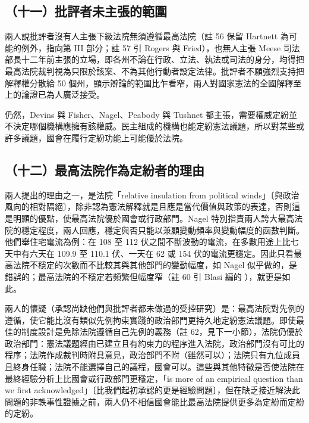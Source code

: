 \subsection{（十一）批評者未主張的範圍}

兩人說批評者沒有人主張下級法院無須遵循最高法院（註 56 保留 Hartnett 為可能的例外，指向第 III 部分；註 57 引 Rogers 與 Fried），也無人主張 Meese 司法部長十二年前主張的立場，即各州不論在行政、立法、執法或司法的身分，均得把最高法院裁判視為只限於該案、不為其他行動者設定法律。批評者不願強烈支持把解釋權分散給 50 個州，顯示辯論的範圍比乍看窄，兩人對國家憲法的全國解釋至上的論證已為人廣泛接受。

仍然，Devins 與 Fisher、Nagel、Peabody 與 Tushnet 都主張，需要權威定紛並不決定哪個機構應擁有該權威。民主組成的機構也能定紛憲法議題，所以對某些或許多議題，國會在履行定紛功能上可能優於法院。

\subsection{（十二）最高法院作為定紛者的理由}

兩人提出的理由之一，是法院「relative insulation from political winds」〔與政治風向的相對隔絕〕，除非認為憲法解釋就是且應是當代價值與政策的表達，否則這是明顯的優點，使最高法院優於國會或行政部門。Nagel 特別指責兩人誇大最高法院的穩定程度，兩人回應，穩定與否只能以兼顧變動頻率與變動幅度的函數判斷。他們舉住宅電流為例：在 108 至 112 伏之間不斷波動的電流，在多數用途上比七天中有六天在 109.9 至 110.1 伏、一天在 62 或 154 伏的電流更穩定。因此只看最高法院不穩定的次數而不比較其與其他部門的變動幅度，如 Nagel 似乎做的，是錯誤的；最高法院的不穩定若頻繁但幅度窄（註 60 引 Blasi 編的 ），就更是如此。

兩人的懷疑（承認尚缺他們與批評者都未做過的受控研究）是：最高法院對先例的遵循，使它能比沒有類似先例拘束實踐的政治部門更持久地定紛憲法議題。即使最佳的制度設計是免除法院遵循自己先例的義務（註 62，見下一小節），法院仍優於政治部門：憲法議題經由已建立且有約束力的程序進入法院，政治部門沒有可比的程序；法院作成裁判時附具意見，政治部門不附（雖然可以）；法院只有九位成員且終身任職；法院不能選擇自己的議程，國會可以。這些與其他特徵是否使法院在最終經驗分析上比國會或行政部門更穩定，「is more of an empirical question than we first acknowledged」〔比我們起初承認的更是經驗問題〕，但在缺乏接近解決此問題的非軼事性證據之前，兩人仍不相信國會能比最高法院提供更多為定紛而定紛的定紛。

